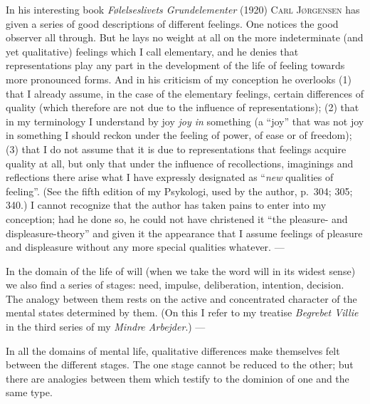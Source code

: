 \documentclass[12pt]{book}
\newcommand{\opage}[1]{\marginnote{\footnotesize\textit{[#1]}}}
\begin{document}
In his interesting book \textit{Følelseslivets Grundelementer} (1920)
\textsc{Carl Jørgensen} has given a series of good descriptions of different
feelings. One notices the good observer all through. But he lays no weight at
all on the more indeterminate (and yet qualitative) feelings which I call
elementary, and he denies that representations play any part in the development
of the life of feeling towards more pronounced forms. And in his criticism of my
conception he overlooks (1) that I already assume, in the case of the elementary
feelings, certain differences of quality (which therefore are not due to the
influence of representations); (2) that in my terminology I understand by joy
\textit{joy in} something (a ``joy'' that was not joy in something I should
reckon under the feeling of power, of ease or of freedom); (3) that I do not
assume that it is due to representations that feelings acquire quality at all,
but only that under the influence of recollections, imaginings and reflections
there arise what I have expressly designated as ``\textit{new} qualities of
feeling''. (See the fifth edition of my Psykologi, used by the author, p.\ 304;
305; 340.) I cannot recognize that the author has taken pains to enter into my
conception; had he done so, he could not have christened it ``the pleasure- and
displeasure-theory'' and given it the appearance that I assume feelings of
pleasure and displeasure without any more special qualities whatever. ---

In the domain of the life of will (when we take the word will in its widest
sense) we also find a series of stages: need, impulse, deliberation, intention,
decision. The analogy \opage{66}between them rests on the active and concentrated
character of the mental states determined by them. (On this I refer to my
treatise \textit{Begrebet Villie} in the third series of my \textit{Mindre
Arbejder}.) ---

In all the domains of mental life, qualitative differences make themselves felt
between the different stages. The one stage cannot be reduced to the other; but
there are analogies between them which testify to the dominion of one and the
same type.
\end{document}
